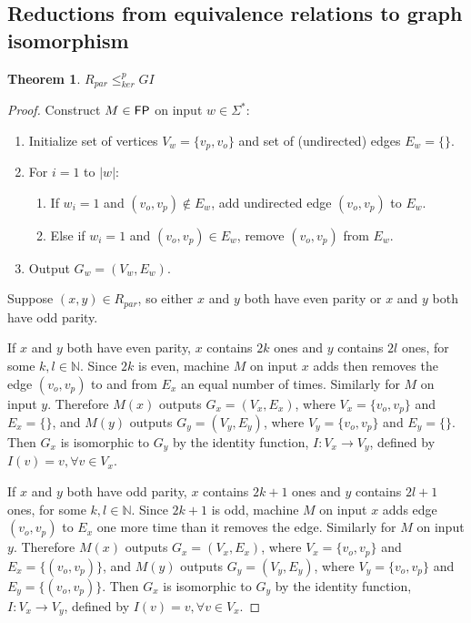 \documentclass{article}
\newtheorem{theorem}{Theorem}[section]
\theoremstyle{definition}
\newcommand{\sigmastar}{\Sigma^{*}}
\newcommand{\kr}{\leq^{p}_{ker}}
\begin{document}
\subsection{Reductions from equivalence relations to graph isomorphism}
\begin{theorem}\label{thm:rpar-gi}$R_{par}\kr GI$\end{theorem}
\begin{proof}
  Construct $M\in {\ensuremath{\mathsf{FP}}}$ on input $w\in\sigmastar$:
  \begin{enumerate}
  \item Initialize set of vertices $V_w=\{v_{p}, v_{o}\}$ and set of
    (undirected) edges $E_w=\{\}$.
  \item For $i=1$ to $|w|$:
    \begin{enumerate}
    \item If $w_i=1$ and $(v_{o}, v_{p})\notin E_w$, add undirected edge
      $(v_{o}, v_{p})$ to $E_w$.
    \item Else if $w_i=1$ and $(v_{o}, v_{p})\in E_w$, remove $(v_{o}, v_{p})$
      from $E_w$.
    \end{enumerate}
  \item Output $G_w=(V_w,E_w)$.
  \end{enumerate}

  Suppose $(x,y)\in R_{par}$, so either $x$ and $y$ both have even parity or
  $x$ and $y$ both have odd parity. 

  If $x$ and $y$ both have even parity, $x$ contains $2k$ ones and $y$ contains
  $2l$ ones, for some $k,l\in\mathbb{N}$. Since $2k$ is even, machine $M$ on
  input $x$ adds then removes the edge $(v_o, v_p)$ to and from $E_x$ an equal
  number of times. Similarly for $M$ on input $y$. Therefore $M(x)$ outputs
  $G_x=(V_x, E_x)$, where $V_x=\{v_o, v_p\}$ and $E_x=\{\}$, and $M(y)$ outputs
  $G_y=(V_y, E_y)$, where $V_y=\{v_o, v_p\}$ and $E_y=\{\}$. Then $G_x$ is
  isomorphic to $G_y$ by the identity function, $I:V_x\to V_y$, defined by
  $I(v)=v, \forall v\in V_x$.

  If $x$ and $y$ both have odd parity, $x$ contains $2k+1$ ones and $y$
  contains $2l+1$ ones, for some $k,l\in\mathbb{N}$. Since $2k+1$ is odd,
  machine $M$ on input $x$ adds edge $(v_o, v_p)$ to $E_x$ one more time than
  it removes the edge. Similarly for $M$ on input $y$. Therefore $M(x)$ outputs
  $G_x=(V_x, E_x)$, where $V_x=\{v_o, v_p\}$ and $E_x=\{(v_o, v_p)\}$, and
  $M(y)$ outputs $G_y=(V_y, E_y)$, where $V_y=\{v_o, v_p\}$ and $E_y=\{(v_o,
  v_p)\}$. Then $G_x$ is isomorphic to $G_y$ by the identity function,
  $I:V_x\to V_y$, defined by $I(v)=v, \forall v\in V_x$.


\end{proof}
\end{document}
